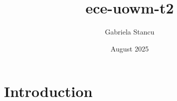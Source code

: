\documentclass{article}
\title{ece-uowm-t2}
\author{Gabriela Stancu}
\date{August 2025}
\begin{document}
\maketitle

\section{Introduction}
\end{document}
